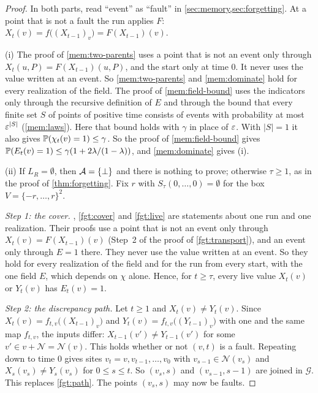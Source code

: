 \begin{proof}
In both parts, read ``event'' as ``fault'' in \cref{sec:memory,sec:forgetting}.
At a point that is not a fault the run applies $F$:
$X_t(v)=f\bigl((X_{t-1})_v\bigr)=F(X_{t-1})(v)$.

(i) The proof of \cref{mem:two-parents} uses a point that is not an event only
through $X_t(u,P)=F(X_{t-1})(u,P)$, and the start only at time $0$. It never uses
the value written at an event. So \cref{mem:two-parents} and \cref{mem:dominate}
hold for every realization of the field. The proof of \cref{mem:field-bound} uses
the indicators only through the recursive definition of $E$ and through the bound
that every finite set $S$ of points of positive time consists of events with
probability at most $\varepsilon^{|S|}$ (\cref{mem:laws}). Here that bound holds with $\gamma$ in
place of $\varepsilon$. With $|S|=1$ it also gives $\mathbb{P}(\chi_t(v)=1)\le\gamma$. So the
proof of \cref{mem:field-bound} gives
$\mathbb{P}(E_t(v)=1)\le\gamma(1+2\lambda/(1-\lambda))$, and \cref{mem:dominate} gives (i).

(ii) If $L_R=\emptyset$, then $\mathcal{A}=\{\bot\}$ and there is nothing to prove; otherwise
$\tau\ge1$, as in the proof of \cref{thm:forgetting}. Fix $r$ with
$S_\tau(0,\dots,0)=\emptyset$ for the box $V=\{-r,\dots,r\}^2$.

\emph{Step 1: the cover.} , \cref{fgt:cover} and \cref{fgt:live}
are statements about one run and one realization. Their proofs use a point that is
not an event only through $X_t(v)=F(X_{t-1})(v)$ (Step~2 of the proof of
\cref{fgt:transport}), and an event only through $E=1$ there. They never use the
value written at an event. So they hold for every realization of the field and for
the run from every start, with the one field $E$, which depends on $\chi$ alone.
Hence, for $t\ge\tau$, every live value $X_t(v)$ or $Y_t(v)$ has $E_t(v)=1$.

\emph{Step 2: the discrepancy path.} Let $t\ge1$ and $X_t(v)\ne Y_t(v)$. Since
$X_t(v)=f_{t,v}\bigl((X_{t-1})_v\bigr)$ and $Y_t(v)=f_{t,v}\bigl((Y_{t-1})_v\bigr)$
with one and the same map $f_{t,v}$, the inputs differ:
$X_{t-1}(v')\ne Y_{t-1}(v')$ for some $v'\in v+\mathcal N=\mathcal N(v)$. This holds
whether or not $(v,t)$ is a fault. Repeating down to time $0$ gives sites
$v_t=v,v_{t-1},\dots,v_0$ with $v_{s-1}\in\mathcal N(v_s)$ and
$X_s(v_s)\ne Y_s(v_s)$ for $0\le s\le t$. So $(v_s,s)$ and $(v_{s-1},s-1)$ are
joined in $\mathcal G$. This replaces \cref{fgt:path}. The points $(v_s,s)$ may now
be faults.


\end{proof}
